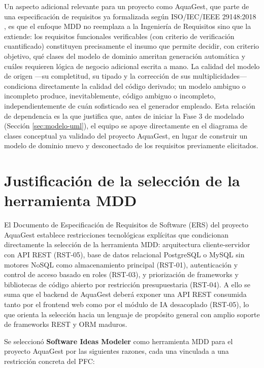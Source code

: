 \documentclass[11pt,a4paper]{article}
\begin{document}
Un aspecto adicional relevante para un proyecto como AquaGest, que parte de una especificación de requisitos ya formalizada según ISO/IEC/IEEE 29148:2018 \citep{iso29148}, es que el enfoque MDD no reemplaza a la Ingeniería de Requisitos sino que la extiende: los requisitos funcionales verificables (con criterio de verificación cuantificado) constituyen precisamente el insumo que permite decidir, con criterio objetivo, qué clases del modelo de dominio ameritan generación automática y cuáles requieren lógica de negocio adicional escrita a mano. La calidad del modelo de origen —su completitud, su tipado y la corrección de sus multiplicidades— condiciona directamente la calidad del código derivado; un modelo ambiguo o incompleto produce, inevitablemente, código ambiguo o incompleto, independientemente de cuán sofisticado sea el generador empleado. Esta relación de dependencia es la que justifica que, antes de iniciar la Fase 3 de modelado (Sección \ref{sec:modelo-uml}), el equipo se apoye directamente en el diagrama de clases conceptual ya validado del proyecto AquaGest, en lugar de construir un modelo de dominio nuevo y desconectado de los requisitos previamente elicitados.

\section{Justificación de la selección de la herramienta MDD}
\label{sec:justificacion-herramienta}

El Documento de Especificación de Requisitos de Software (ERS) del proyecto AquaGest establece restricciones tecnológicas explícitas que condicionan directamente la selección de la herramienta MDD: arquitectura cliente-servidor con API REST (RST-05), base de datos relacional PostgreSQL o MySQL sin motores NoSQL como almacenamiento principal (RST-01), autenticación y control de acceso basado en roles (RST-03), y priorización de frameworks y bibliotecas de código abierto por restricción presupuestaria (RST-04). A ello se suma que el backend de AquaGest deberá exponer una API REST consumida tanto por el frontend web como por el módulo de IA desacoplado (RST-05), lo que orienta la selección hacia un lenguaje de propósito general con amplio soporte de frameworks REST y ORM maduros.

Se seleccionó \textbf{Software Ideas Modeler} como herramienta MDD para el proyecto AquaGest por las siguientes razones, cada una vinculada a una restricción concreta del PFC:
\end{document}
